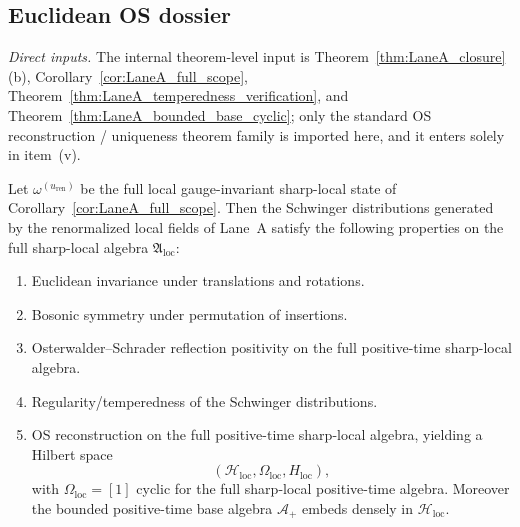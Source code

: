 \subsection{Euclidean OS dossier}

\noindent\emph{Direct inputs.} The internal theorem-level input is Theorem~\ref{thm:LaneA_closure}(b), Corollary~\ref{cor:LaneA_full_scope}, Theorem~\ref{thm:LaneA_temperedness_verification}, and Theorem~\ref{thm:LaneA_bounded_base_cyclic}; only the standard OS reconstruction / uniqueness theorem family is imported here, and it enters solely in item~(v).\par

\begin{theorem}\label{thm:OS_axioms_package}
Let $\omega^{(u_{\mathrm{ren}})}$ be the full local gauge-invariant sharp-local state of Corollary~\ref{cor:LaneA_full_scope}.
Then the Schwinger distributions generated by the renormalized local fields of Lane~A satisfy the following properties on the full sharp-local algebra $\mathfrak A_{\mathrm{loc}}$:
\begin{enumerate}[label=(\roman*),leftmargin=2.3em]
\item Euclidean invariance under translations and rotations.
\item Bosonic symmetry under permutation of insertions.
\item Osterwalder--Schrader reflection positivity on the full positive-time sharp-local algebra.
\item Regularity/temperedness of the Schwinger distributions.
\item OS reconstruction on the full positive-time sharp-local algebra, yielding a Hilbert space
\[
(\mathcal H_{\mathrm{loc}},\Omega_{\mathrm{loc}},H_{\mathrm{loc}}),
\]
with $\Omega_{\mathrm{loc}}=[1]$ cyclic for the full sharp-local positive-time algebra.
Moreover the bounded positive-time base algebra $\mathcal A_+$ embeds densely in $\mathcal H_{\mathrm{loc}}$.
\end{enumerate}
\end{theorem}

